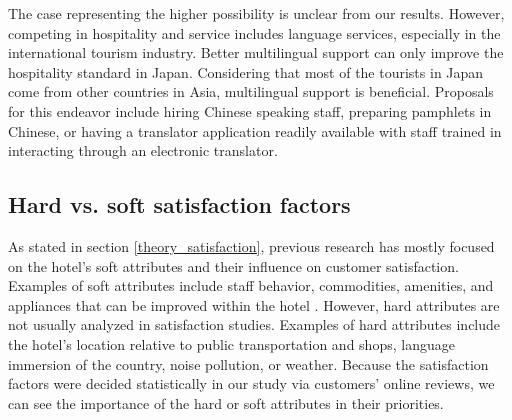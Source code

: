 \documentclass[smallextended,natbib]{svjour3}       %
\begin{document}
    The case representing the higher possibility is unclear from our results. However, competing in hospitality and service includes language services, especially in the international tourism industry. Better multilingual support can only improve the hospitality standard in Japan. Considering that most of the tourists in Japan come from other countries in Asia, multilingual support is beneficial. Proposals for this endeavor include hiring Chinese speaking staff, preparing pamphlets in Chinese, or having a translator application readily available with staff trained in interacting through an electronic translator.

  \subsection{Hard vs. soft satisfaction factors}\label{disc:hard_soft}

    As stated in section \ref{theory_satisfaction}, previous research has mostly focused on the hotel's soft attributes and their influence on customer satisfaction. Examples of soft attributes include staff behavior, commodities, amenities, and appliances that can be improved within the hotel \cite[e.g.,][]{shanka2004,choi2001}. However, hard attributes are not usually analyzed in satisfaction studies. Examples of hard attributes include the hotel's location relative to public transportation and shops, language immersion of the country, noise pollution, or weather. Because the satisfaction factors were decided statistically in our study via customers’ online reviews, we can see the importance of the hard or soft attributes in their priorities.
\end{document}
